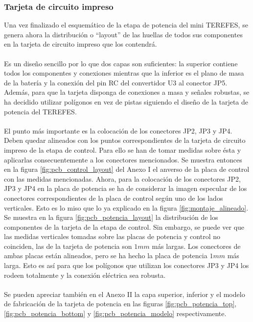 \subsubsection{Tarjeta de circuito impreso}
Una vez finalizado el esquemático de la etapa de potencia del mini TEREFES, se genera ahora la distribución o ``layout'' de las huellas de todos sus componentes en la tarjeta de circuito impreso que los contendrá. 
\\
\\
Es un diseño sencillo por lo que dos capas son suficientes: la superior contiene todos los componentes y conexiones mientras que la inferior es el plano de masa de la batería y la conexión del pin RC del convertidor U3 al conector JP5. Además, para que la tarjeta disponga de conexiones a masa y señales robustas, se ha decidido utilizar polígonos en vez de pistas siguiendo el diseño de la tarjeta de potencia del TEREFES.
\\
\\
El punto más importante es la colocación de los conectores JP2, JP3 y JP4. Deben quedar alineados con los puntos correspondientes de la tarjeta de circuito impreso de la etapa de control. Para ello se han de tomar medidas sobre ésta y aplicarlas consecuentemente a los conectores mencionados. Se muestra entonces en la figura \ref{fig:pcb_control_layout} del Anexo I el anverso de la placa de control con las medidas mencionadas. Ahora, para la colocación de los conectores JP2, JP3 y JP4 en la placa de potencia se ha de considerar la imagen especular de los conectores correspondientes de la placa de control según uno de los lados verticales. Esto es lo miso que lo ya explicado en la figura \ref{fig:montaje_alineado}. Se muestra en la figura \ref{fig:pcb_potencia_layout} la distribución de los componentes de la tarjeta de la etapa de control. Sin embargo, se puede ver que las medidas verticales tomadas sobre las placas de potencia y control no coinciden, las de la tarjeta de potencia son $1mm$ más largas. Los conectores de ambas placas están alineados, pero se ha hecho la placa de potencia $1mm$ más larga. Esto es así para que los polígonos que utilizan los conectores JP3 y JP4 los rodeen totalmente y la conexión eléctrica sea robusta.
\\
\\
Se pueden apreciar también en el Anexo II la capa superior, inferior y el modelo de fabricación de la tarjeta de potencia en las figuras \ref{fig:pcb_potencia_top}, \ref{fig:pcb_potencia_bottom} y \ref{fig:pcb_potencia_modelo} respectivamente.\\

